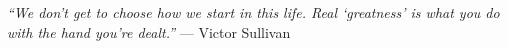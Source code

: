 \thispagestyle{empty}\mbox{}{\textheight}\mbox{}\hfill\begin{minipage}{0.55\textwidth}%

\newcommand{\ip}%
    {\hspace{0.34em}\raisebox{0.22ex}{\textperiodcentered}\hspace{0.34em}}
\newcommand{\motto}%
    {\ip{}\ip{}}

{\large\motto}\\\\

\textit{``We don't get to choose how we start in this life. Real `greatness' is what you do with the hand you're dealt.''}
\flushright --- Victor Sullivan
\normalfont\end{minipage}